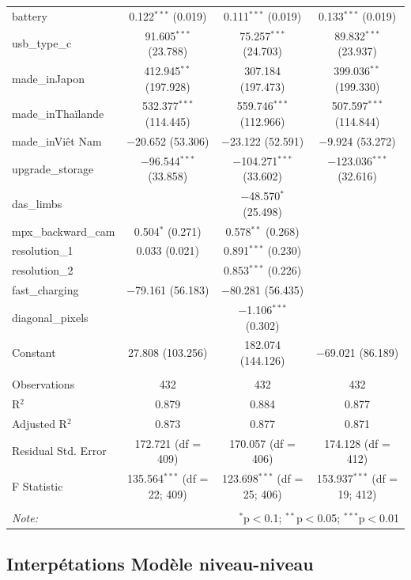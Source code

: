 \documentclass[
  12pt,
]{report}
\begin{document}
\begin{table}[!htbp]
\begin{tabular}{@{\extracolsep{5pt}}lccc}
  battery & 0.122$^{***}$ (0.019) & 0.111$^{***}$ (0.019) & 0.133$^{***}$ (0.019) \\ 
  usb\_type\_c & 91.605$^{***}$ (23.788) & 75.257$^{***}$ (24.703) & 89.832$^{***}$ (23.937) \\ 
  made\_inJapon & 412.945$^{**}$ (197.928) & 307.184 (197.473) & 399.036$^{**}$ (199.330) \\ 
  made\_inThaïlande & 532.377$^{***}$ (114.445) & 559.746$^{***}$ (112.966) & 507.597$^{***}$ (114.844) \\ 
  made\_inViêt Nam & $-$20.652 (53.306) & $-$23.122 (52.591) & $-$9.924 (53.272) \\ 
  upgrade\_storage & $-$96.544$^{***}$ (33.858) & $-$104.271$^{***}$ (33.602) & $-$123.036$^{***}$ (32.616) \\ 
  das\_limbs &  & $-$48.570$^{*}$ (25.498) &  \\ 
  mpx\_backward\_cam & 0.504$^{*}$ (0.271) & 0.578$^{**}$ (0.268) &  \\ 
  resolution\_1 & 0.033 (0.021) & 0.891$^{***}$ (0.230) &  \\ 
  resolution\_2 &  & 0.853$^{***}$ (0.226) &  \\ 
  fast\_charging & $-$79.161 (56.183) & $-$80.281 (56.435) &  \\ 
  diagonal\_pixels &  & $-$1.106$^{***}$ (0.302) &  \\ 
  Constant & 27.808 (103.256) & 182.074 (144.126) & $-$69.021 (86.189) \\ 
 \hline \\[-1.8ex] 
Observations & 432 & 432 & 432 \\ 
R$^{2}$ & 0.879 & 0.884 & 0.877 \\ 
Adjusted R$^{2}$ & 0.873 & 0.877 & 0.871 \\ 
Residual Std. Error & 172.721 (df = 409) & 170.057 (df = 406) & 174.128 (df = 412) \\ 
F Statistic & 135.564$^{***}$ (df = 22; 409) & 123.698$^{***}$ (df = 25; 406) & 153.937$^{***}$ (df = 19; 412) \\ 
\hline 
\hline \\[-1.8ex] 
\textit{Note:}  & \multicolumn{3}{r}{$^{*}$p$<$0.1; $^{**}$p$<$0.05; $^{***}$p$<$0.01} \\ 
\end{tabular} 
\end{table}

\newpage

\subsection{Interpétations Modèle
niveau-niveau}\label{interpuxe9tations-moduxe8le-niveau-niveau}
\end{document}

